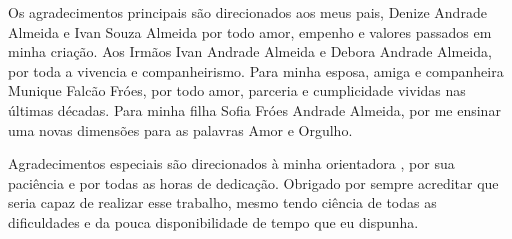 

\begin{agradecimentos}
Os agradecimentos principais são direcionados aos meus pais, Denize Andrade Almeida e Ivan Souza Almeida por todo amor, empenho e valores passados em minha criação. Aos Irmãos Ivan Andrade Almeida e Debora Andrade Almeida, por toda a vivencia e companheirismo. Para minha esposa, amiga e companheira Munique Falcão Fróes, por todo amor, parceria e cumplicidade vividas nas últimas décadas. Para minha filha Sofia Fróes Andrade Almeida, por me ensinar uma novas dimensões para as palavras Amor e Orgulho.

Agradecimentos especiais são direcionados à minha orientadora \imprimirorientador, por sua paciência e por todas as horas de dedicação. Obrigado por sempre acreditar que seria capaz de realizar esse trabalho, mesmo tendo ciência de todas as dificuldades e da pouca disponibilidade de tempo que eu dispunha.

\end{agradecimentos}
